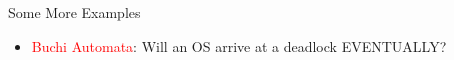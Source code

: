 \documentclass[usenames,dvipsnames]{beamer}
\begin{document}
\begin{frame}{Some More Examples}
\begin{itemize}
\begin{figure}[scale = 0.5]
            \end{figure}


            \item <4-> \textcolor{red}{Buchi Automata}: Will an OS arrive at a deadlock EVENTUALLY?
        \end{itemize}
\end{frame}

\newcommand{\txtimg}[3]{\raisebox{#1}{\texttt{[image: \#3]}}}
\end{document}
